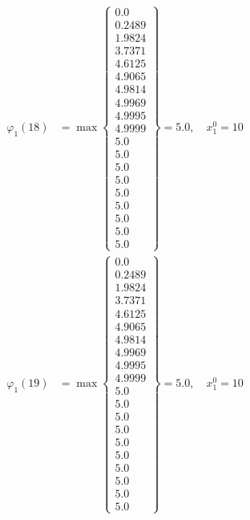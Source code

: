 \documentclass{article}
\begin{document}
\begin{align*}
  
\varphi_{1}(18) &= \max \left\{ \begin{array}{c}
0.0 \\
 0.2489 \\
 1.9824 \\
 3.7371 \\
 4.6125 \\
 4.9065 \\
 4.9814 \\
 4.9969 \\
 4.9995 \\
 4.9999 \\
 5.0 \\
 5.0 \\
 5.0 \\
 5.0 \\
 5.0 \\
 5.0 \\
 5.0 \\
 5.0 \\
 5.0
\end{array} \right\}=5.0,\quad x_{1}^0=10\\
  
  
  
  
\varphi_{1}(19) &= \max \left\{ \begin{array}{c}
0.0 \\
 0.2489 \\
 1.9824 \\
 3.7371 \\
 4.6125 \\
 4.9065 \\
 4.9814 \\
 4.9969 \\
 4.9995 \\
 4.9999 \\
 5.0 \\
 5.0 \\
 5.0 \\
 5.0 \\
 5.0 \\
 5.0 \\
 5.0 \\
 5.0 \\
 5.0 \\
 5.0
\end{array} \right\}=5.0,\quad x_{1}^0=10\\
  
  
  

\end{align*}
\end{document}
